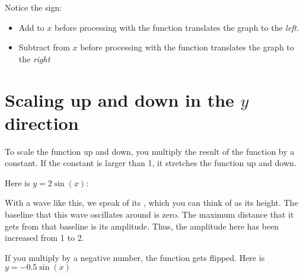 Notice the sign:
\begin{itemize}
\item Add to $x$ before processing with the function translates the graph to the \emph{left}.
\item Subtract from $x$ before processing with the function translates the graph to the \emph{right}
\end{itemize}

\section{Scaling up and down in the $y$ direction}

To scale the function up and down, you multiply the result of the
function by a constant.  If the constant is larger than 1, it
stretches the function up and down.

Here is $y = 2\sin(x)$:


With a wave like this, we speak of its , which you
can think of as its height. The baseline that this wave oscillates
around is zero. The maximum distance that it gets from that baseline
is its amplitude.  Thus, the amplitude here has been increased from 1
to 2.

If you multiply by a negative number, the function gets flipped.  Here is $y = -0.5 \sin(x)$

